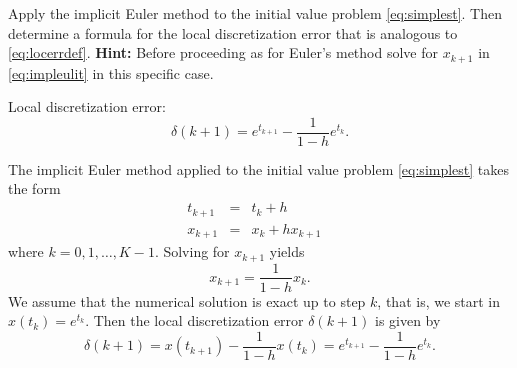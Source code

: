 \documentclass{ximera}
\begin{document}
\begin{exercise} \label{c15.2.2}
Apply the implicit Euler method to the initial value problem
\eqref{eq:simplest}.  Then determine a formula for the local 
discretization error that is analogous to \eqref{eq:locerrdef}.
{\bf Hint:} Before proceeding as for Euler's method solve
for $x_{k+1}$ in \eqref{eq:impleulit} in this specific case.

\begin{solution}
\ans Local discretization error:
\[
\delta(k+1) = e^{t_{k+1}} - \frac{1}{1-h} e^{t_k}.
\]

\soln The implicit Euler method applied to the initial value problem
\eqref{eq:simplest} takes the form
\[
\begin{array}{rclc}
t_{k+1} & = & t_k+h & \\
x_{k+1} & = & x_k + h x_{k+1} &
\end{array}
\]
where $k=0,1,\ldots,K-1$.  Solving for $x_{k+1}$ yields
\[
x_{k+1} = \frac{1}{1-h}x_k.
\]
We assume that the numerical solution is exact up to step $k$, that is,
we start in $x(t_k)=e^{t_k}$.  Then the local discretization error
$\delta(k+1)$ is given by
\[
\delta(k+1) = x(t_{k+1}) - \frac{1}{1-h}x(t_k)=
e^{t_{k+1}} - \frac{1}{1-h}e^{t_k}.
\]

\end{solution}
\end{exercise}
\end{document}
